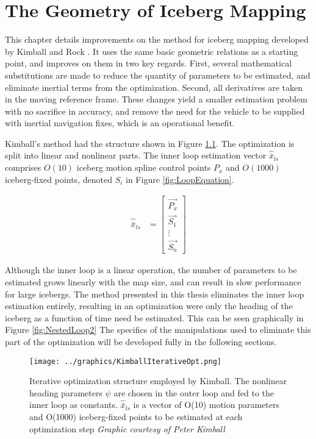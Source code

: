 
\chapter{The Geometry of Iceberg Mapping}
\label{ch.IcebergGeometry}

This chapter details improvements on the method for iceberg mapping developed by Kimball and Rock \cite{}. It uses the same basic geometric relations as a starting point, and improves on them in two key regards. First, several mathematical substitutions are made to reduce the quantity of parameters to be estimated, and eliminate inertial terms from the optimization. Second, all derivatives are taken in the moving reference frame. These changes yield a smaller estimation problem with no sacrifice in accuracy, and remove the need for the vehicle to be supplied with inertial navigation fixes, which is an operational benefit.

Kimball's method had the structure shown in Figure \ref{fig:NestedLoop}. The optimization is split into linear and nonlinear parts. The inner loop estimation vector $\hat{\bar{x}}_{ls}$ comprises $O(10)$ iceberg motion spline control points $P_x$ and $O(1000)$ iceberg-fixed points, denoted $S_i$ in Figure \ref{fig:LoopEquation}.

\begin{align}
\hat{\bar{x}}_{ls} &= 
        \left[\begin{array}{c}
        \vec{P_x}\\
        \vec{S_1}\\
        \vdots\\
        \vec{S_n}
        \end{array}
        \right]
\end{align}

Although the inner loop is a linear operation, the number of parameters to be estimated grows linearly with the map size, and can result in slow performance for large icebergs. The method presented in this thesis eliminates the inner loop estimation entirely, resulting in an optimization were only the heading of the iceberg as a function of time need be estimated. This can be seen graphically in Figure \ref{fig:NestedLoop2} The specifics of the manipulations used to eliminate this part of the optimization will be developed fully in the following sections. 

\begin{figure}[htbp]
   \centering
   \texttt{[image: ../graphics/KimballIterativeOpt.png]} %
   \caption{Iterative optimization structure employed by Kimball. The nonlinear heading parameters $\psi$ are chosen in the outer loop and fed to the inner loop as constants. $\hat{\bar{x}}_{ls}$ is a vector of O(10) motion parameters and O(1000) iceberg-fixed points to be estimated at each optimization step  \emph{Graphic courtesy of Peter Kimball}}
   \label{fig:NestedLoop}
\end{figure}

